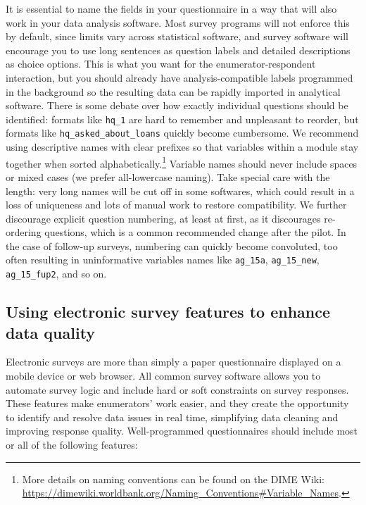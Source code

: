 \documentclass[
]{book}
\begin{document}
It is essential to name the fields in your questionnaire
in a way that will also work in your data analysis software.
Most survey programs will not enforce this by default,
since limits vary across statistical software,
and survey software will encourage you
to use long sentences as question labels
and detailed descriptions as choice options.
This is what you want for the enumerator-respondent interaction,
but you should already have analysis-compatible labels programmed in the background
so the resulting data can be rapidly imported in analytical software.
There is some debate over how exactly individual questions should be identified:
formats like \texttt{hq\_1} are hard to remember and unpleasant to reorder,
but formats like \texttt{hq\_asked\_about\_loans} quickly become cumbersome.
We recommend using descriptive names with clear prefixes so that variables
within a module stay together when sorted alphabetically.\footnote{More details on naming conventions can be found on the DIME Wiki:
  \url{https://dimewiki.worldbank.org/Naming_Conventions\#Variable_Names}.}
Variable names should never include spaces or mixed cases
(we prefer all-lowercase naming).
Take special care with the length: very long names will be cut off in some softwares,
which could result in a loss of uniqueness and lots of manual work to restore compatibility.
We further discourage explicit question numbering,
at least at first, as it discourages re-ordering questions,
which is a common recommended change after the pilot.
In the case of follow-up surveys, numbering can quickly become convoluted,
too often resulting in uninformative variables names like
\texttt{ag\_15a}, \texttt{ag\_15\_new}, \texttt{ag\_15\_fup2}, and so on.

\hypertarget{using-electronic-survey-features-to-enhance-data-quality}{%
\subsection*{Using electronic survey features to enhance data quality}\label{using-electronic-survey-features-to-enhance-data-quality}}

Electronic surveys are more than simply
a paper questionnaire displayed on a mobile device or web browser.
All common survey software allows you to automate survey logic
and include hard or soft constraints on survey responses.
These features make enumerators' work easier,
and they create the opportunity to identify and resolve
data issues in real time,
simplifying data cleaning and improving response quality.
Well-programmed questionnaires should include
most or all of the following features:
\end{document}
